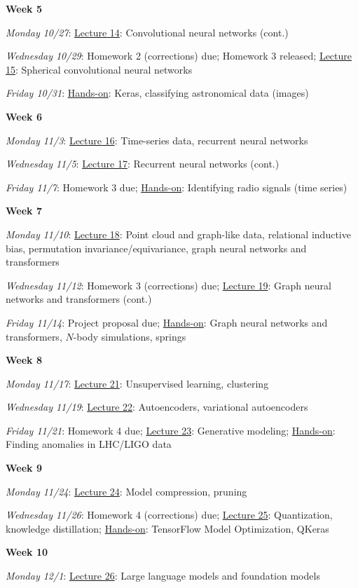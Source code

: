 \documentclass[12pt]{article}
\begin{document}
\noindent\textbf{Week 5}

\emph{Monday 10/27}: \underline{Lecture 14}: Convolutional neural networks (cont.)

\emph{Wednesday 10/29}: Homework 2 (corrections) due; Homework 3 released; \underline{Lecture 15}: Spherical convolutional neural networks

\emph{Friday 10/31}: \underline{Hands-on}: Keras, classifying astronomical data (images)

\noindent\textbf{Week 6}

\emph{Monday 11/3}: \underline{Lecture 16}: Time-series data, recurrent neural networks

\emph{Wednesday 11/5}: \underline{Lecture 17}: Recurrent neural networks (cont.)

\emph{Friday 11/7}: Homework 3 due; \underline{Hands-on}: Identifying radio signals (time series)

\noindent\textbf{Week 7}

\emph{Monday 11/10}: \underline{Lecture 18}: Point cloud and graph-like data, relational inductive bias, permutation invariance/equivariance, graph neural networks and transformers

\emph{Wednesday 11/12}: Homework 3 (corrections) due; \underline{Lecture 19}: Graph neural networks and transformers (cont.)

\emph{Friday 11/14}: Project proposal due; \underline{Hands-on}: Graph neural networks and transformers, $N$-body simulations, springs

\noindent\textbf{Week 8}

\emph{Monday 11/17}: \underline{Lecture 21}: Unsupervised learning, clustering

\emph{Wednesday 11/19}: \underline{Lecture 22}: Autoencoders, variational autoencoders

\emph{Friday 11/21}: Homework 4 due; \underline{Lecture 23}: Generative modeling; \underline{Hands-on}: Finding anomalies in LHC/LIGO data

\noindent\textbf{Week 9}

\emph{Monday 11/24}: \underline{Lecture 24}: Model compression, pruning

\emph{Wednesday 11/26}: Homework 4 (corrections) due; \underline{Lecture 25}: Quantization, knowledge distillation; \underline{Hands-on}: TensorFlow Model Optimization, QKeras

\noindent\textbf{Week 10}

\emph{Monday 12/1}: \underline{Lecture 26}: Large language models and foundation models
\end{document}
